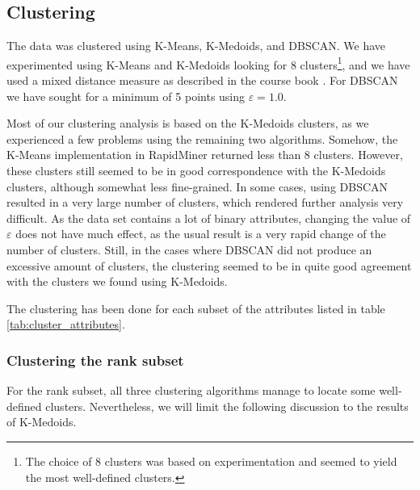 \subsection{Clustering}
\label{subsec:clustering}

The data was clustered using {K-Means}, {K-Medoids}, and {DBSCAN}. We have experimented using {K-Means} and {K-Medoids} looking for 8 clusters\footnote{The choice of 8 clusters was based on experimentation and seemed to yield the most well-defined clusters.}, and we have used a mixed distance measure as described in the course book \cite{book}. For {DBSCAN} we have sought for a minimum of 5 points using $\varepsilon = 1.0$.

Most of our clustering analysis is based on the {K-Medoids} clusters, as we experienced a few problems using the remaining two algorithms. Somehow, the {K-Means} implementation in {RapidMiner} returned less than 8 clusters. However, these clusters still seemed to be in good correspondence with the {K-Medoids} clusters, although somewhat less fine-grained. In some cases, using {DBSCAN} resulted in a very large number of clusters, which rendered further analysis very difficult. As the data set contains a lot of binary attributes, changing the value of $\varepsilon$ does not have much effect, as the usual result is a very rapid change of the number of clusters. Still, in the cases where {DBSCAN} did not produce an excessive amount of clusters, the clustering seemed to be in quite good agreement with the clusters we found using {K-Medoids}.

The clustering has been done for each subset of the attributes listed in table \ref{tab:cluster_attributes}.

\subsubsection{Clustering the rank subset}

For the rank subset, all three clustering algorithms manage to locate some well-defined clusters. Nevertheless, we will limit the following discussion to the results of {K-Medoids}.



